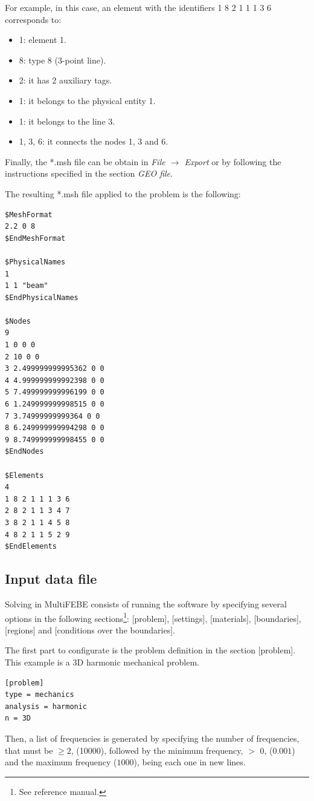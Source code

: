 \documentclass[a4]{article}
\begin{document}
For example, in this case, an element with the identifiers 1 8 2 1 1 1 3 6 corresponds to:

\begin{itemize}
	\item 1: element 1.
	\item 8: type 8 (3-point line).
	\item 2: it has 2 auxiliary tags.
	\item 1: it belongs to the physical entity 1.
	\item 1: it belongs to the line 3.
	\item 1, 3, 6: it connects the nodes 1, 3 and 6.
\end{itemize} 

Finally, the *.msh file can be obtain in  \textit{File $\to$ Export} or by following the instructions specified in the section \textit{GEO file}.

The resulting *.msh file applied to the problem is the following:

\begin{Verbatim}
$MeshFormat
2.2 0 8
$EndMeshFormat

$PhysicalNames
1
1 1 "beam"
$EndPhysicalNames

$Nodes
9
1 0 0 0
2 10 0 0
3 2.499999999995362 0 0
4 4.999999999992398 0 0
5 7.499999999996199 0 0
6 1.249999999998515 0 0
7 3.74999999999364 0 0
8 6.249999999994298 0 0
9 8.749999999998455 0 0
$EndNodes

$Elements
4
1 8 2 1 1 1 3 6
2 8 2 1 1 3 4 7
3 8 2 1 1 4 5 8
4 8 2 1 1 5 2 9
$EndElements
\end{Verbatim}

\subsection{Input data file}
Solving in MultiFEBE consists of running the software by specifying several options in the following sections\footnote{See reference manual.}: [problem], [settings], [materials], [boundaries], [regions] and [conditions over the boundaries].

The first part to configurate is the problem definition in the section [problem]. This example is a 3D harmonic mechanical problem.  

\begin{Verbatim}	
[problem]
type = mechanics
analysis = harmonic
n = 3D
\end{Verbatim}

Then, a list of frequencies is generated by specifying the number of frequencies, that must be $\geq 2$, (10000), followed by the minimum frequency, $>$ 0, ($0.001$) and the maximum frequency ($1000$), being each one in new lines.
\end{document}
